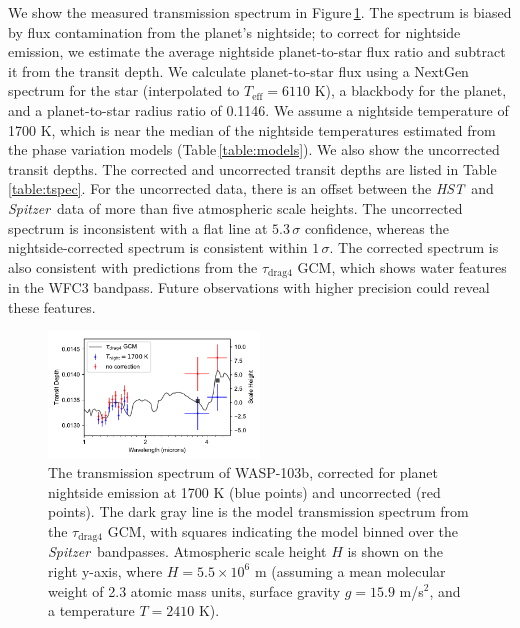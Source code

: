 \documentclass[twocolumn, trackchanges]{aastex61}
\newcommand{\project}[1]{\textsl{#1}}
\newcommand{\HST}{\project{HST}}
\newcommand{\Spitzer}{\project{Spitzer}}
\begin{document}
We show the measured transmission spectrum in Figure\,\ref{fig:tspectrum}.  The spectrum is biased by flux contamination from the planet's nightside; to correct for nightside emission, we estimate the average nightside planet-to-star flux ratio and subtract it from the transit depth. We calculate planet-to-star flux using a NextGen spectrum for the star (interpolated to $T_\mathrm{eff} = 6110$ K), a blackbody for the planet, and a planet-to-star radius ratio of 0.1146. We assume a nightside temperature of 1700 K, which is near the median of the nightside temperatures estimated from the phase variation models (Table\,\ref{table:models}). We also show the uncorrected transit depths. The corrected and uncorrected transit depths are listed in Table\,\ref{table:tspec}. For the uncorrected data, there is an offset between the \HST\ and \Spitzer\ data of more than five atmospheric scale heights.  The uncorrected spectrum is inconsistent with a flat line at $5.3\,\sigma$ confidence, whereas the nightside-corrected spectrum is consistent within $1\,\sigma$.  The corrected spectrum is also consistent with predictions from the $\tau_\mathrm{drag4}$ GCM, which shows water features in the WFC3 bandpass. Future observations with higher precision could reveal these features. %

\begin{figure}
\includegraphics[width = 0.5\textwidth]{fig10.pdf}
\caption{The transmission spectrum of WASP-103b, corrected for planet nightside emission at 1700 K (blue points) and uncorrected (red points). The dark gray line is the model transmission spectrum from the $\tau_\mathrm{drag4}$ GCM, with squares indicating the model binned over the \Spitzer\ bandpasses. Atmospheric scale height $H$ is shown on the right y-axis, where $H = 5.5\times10^6$ m (assuming a mean molecular weight of 2.3 atomic mass units, surface gravity $g = 15.9$ m/s$^2$, and a temperature $T = 2410$ K).}
\label{fig:tspectrum}
\end{figure}
\end{document}
